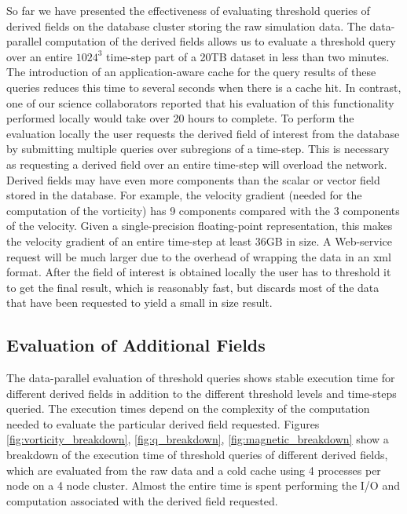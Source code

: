 \documentclass{sig-alternate}
\begin{document}
So far we have presented the effectiveness of evaluating threshold queries of derived fields on the database cluster storing the raw simulation data. The 
data-parallel computation of the derived fields allows us to evaluate a threshold query over
an entire $1024^3$ time-step part of a 20TB dataset in less than two minutes. The introduction of an application-aware cache for the query results of these
queries reduces this time to several seconds when there is a cache hit. In contrast, one of our science collaborators reported that his evaluation of this
functionality performed locally would take over 20 hours to complete. 
To perform the evaluation locally the user requests the derived field of interest from the database by submitting multiple queries over
subregions of a time-step. This is necessary as requesting a derived field over an entire time-step will overload the network. Derived fields may have even
more components than the scalar or vector field stored in the database. For example, the velocity gradient (needed for the computation of the vorticity) has 9
components compared with the 3 components of the velocity. Given a single-precision floating-point representation, this makes the velocity gradient of an
entire time-step at least 36GB in size. A Web-service request will be much larger due to the overhead of wrapping the data in an xml format. After the
field of interest is obtained locally the user has to threshold it to get the final result, which is reasonably fast, but discards most of the data that have been
requested to yield a small in size result. 

\subsection{Evaluation of Additional Fields}
The data-parallel evaluation of threshold queries shows stable execution time for different derived fields in addition to the different threshold levels and
time-steps queried. The execution times depend on the complexity of the computation needed to evaluate the particular derived field requested. Figures 
\ref{fig:vorticity_breakdown}, \ref{fig:q_breakdown}, \ref{fig:magnetic_breakdown} show a breakdown of the execution time of threshold queries of different
derived fields, which are evaluated from the raw data and a cold cache using 4 processes per node on a 4 node cluster. Almost the entire time is spent
performing the I/O and computation associated with the derived field requested. 
\end{document}
